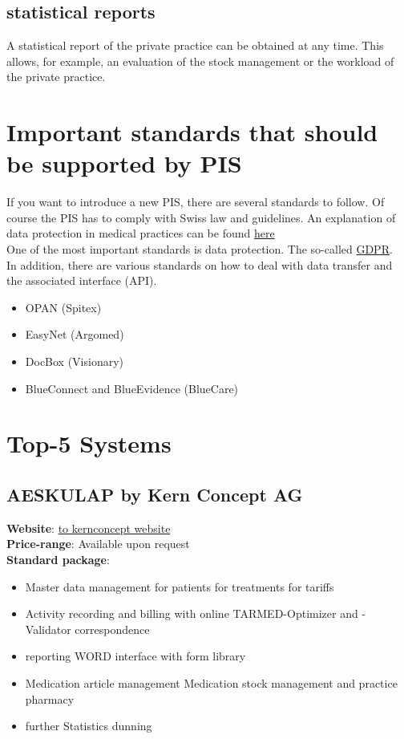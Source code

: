 \documentclass{report}
\begin{document}
\subsection{statistical reports}
A statistical report of the private practice can be obtained at any time. This allows, for example, an evaluation of the stock management or the workload of the private practice. 

\section{Important standards that should be supported by PIS}
If you want to introduce a new PIS, there are several standards to follow. Of course the PIS has to comply with Swiss law and guidelines. 
An explanation of data protection in medical practices can be found \href{https://www.edoeb.admin.ch/edoeb/de/home/datenschutz/gesundheit/erlaeuterungen-zum-datenschutz-in-der-arztpraxis.html}{here}\\

One of the most important standards is data protection. The so-called \href{https://gdpr-info.eu/}{GDPR}.\\

In addition, there are various standards on how to deal with data transfer and the associated interface (API).
\begin{itemize}
   \item OPAN (Spitex)
   \item EasyNet (Argomed)
   \item DocBox (Visionary)
   \item BlueConnect and BlueEvidence (BlueCare)
\end{itemize}


\section{Top-5 Systems}

\subsection{AESKULAP by Kern Concept AG}
\textbf{Website}: \href{https://kernconcept.ch/aerztesoftware/}{to kernconcept website} \\
\textbf{Price-range}: Available upon request\\ 
\textbf{Standard package}: 
\begin{itemize}
   \item Master data management
   \subitem for patients
   \subitem for treatments
   \subitem for tariffs 
   \item Activity recording and billing
   \subitem with online TARMED-Optimizer and -Validator correspondence
   \item reporting
   \subitem WORD interface with form library 
   \item Medication article management
   \subitem Medication
   \subitem stock management and practice pharmacy
   \item further
   \subitem Statistics
   \subitem dunning 
\end{itemize}
\end{document}

